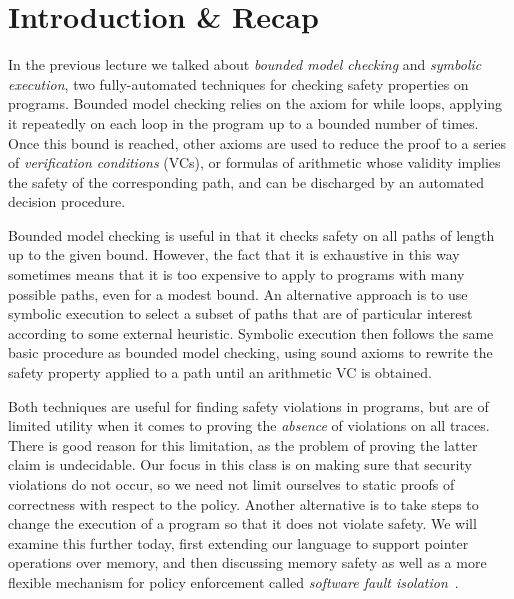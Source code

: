 \documentclass[11pt,twoside]{scrartcl}
\begin{document}
\newcommand{\atrace}{\sigma}%
\newcommand{\stdI}{\dTLint[state=\omega]}%
\newcommand{\Ip}{\dTLint[trace=\atrace]}%
\newcommand{\ws}{\omega}\newcommand{\wt}{\nu}%

\maketitle
\thispagestyle{empty}


\section{Introduction \& Recap}

In the previous lecture we talked about \emph{bounded model checking} and \emph{symbolic execution}, two fully-automated techniques for checking safety properties on programs. Bounded model checking relies on the  axiom for while loops, applying it repeatedly on each loop in the program up to a bounded number of times. Once this bound is reached, other axioms are used to reduce the proof to a series of \emph{verification conditions} (VCs), or formulas of arithmetic whose validity implies the safety of the corresponding path, and can be discharged by an automated decision procedure.

Bounded model checking is useful in that it checks safety on all paths of length up to the given bound. However, the fact that it is exhaustive in this way sometimes means that it is too expensive to apply to programs with many possible paths, even for a modest bound. An alternative approach is to use symbolic execution to select a subset of paths that are of particular interest according to some external heuristic. Symbolic execution then follows the same basic procedure as bounded model checking, using sound axioms to rewrite the safety property applied to a path until an arithmetic VC is obtained. 

Both techniques are useful for finding safety violations in programs, but are of limited utility when it comes to proving the \emph{absence} of violations on all traces. There is good reason for this limitation, as the problem of proving the latter claim is undecidable. Our focus in this class is on making sure that security violations do not occur, so we need not limit ourselves to static proofs of correctness with respect to the policy. Another alternative is to take steps to change the execution of a program so that it does not violate safety. We will examine this further today, first extending our language to support pointer operations over memory, and then discussing memory safety as well as a more flexible mechanism for policy enforcement called \emph{software fault isolation}~\cite{Sehr2010,Yee2009}.
\end{document}
